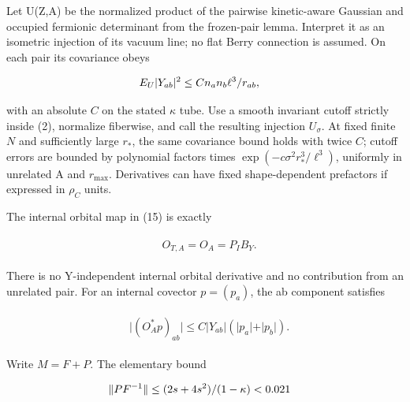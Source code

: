 Let U(Z,A) be the normalized product of the pairwise kinetic-aware
Gaussian and occupied fermionic determinant from the frozen-pair lemma.
Interpret it as an isometric injection of its vacuum line; no flat Berry
connection is assumed. On each pair its covariance obeys

\begin{gather*}
\begin{aligned}
& E_{U} \vert Y_{ab}\vert ^{2} \le  C n_{a} n_{b} \ell ^{3}/r_{ab},
\end{aligned}\notag
\end{gather*}

with an absolute \(C\) on the stated \(\kappa\) tube. Use a smooth
invariant cutoff strictly inside (2), normalize fiberwise, and call the
resulting injection \(U_{\sigma}\). At fixed finite \(N\) and
sufficiently large \(r_{*}\), the same covariance bound holds with twice
\(C\); cutoff errors are bounded by polynomial factors times
\(\exp (-c \sigma ^{2} r_{*}^{3}/\ell ^{3})\), uniformly in unrelated A
and \(r_{\max}\). Derivatives can have fixed shape-dependent prefactors
if expressed in \(\rho _{C}\) units.

The internal orbital map in (15) is exactly

\begin{gather*}
\begin{aligned}
& O_{T,A}=O_{A}=P_{I} B_{Y}.
\end{aligned}\tag{19}
\end{gather*}

There is no Y-independent internal orbital derivative and no
contribution from an unrelated pair. For an internal covector
\(p=(p_{a})\), the ab component satisfies

\begin{gather*}
\begin{aligned}
& \vert (O_{A}^{*}p)_{ab}\vert  \le  C \vert Y_{ab}\vert  (\vert p_{a}\vert +\vert p_{b}\vert ).
\end{aligned}\tag{20}
\end{gather*}

Write \(M=F+P\). The elementary bound

\begin{gather*}
\begin{aligned}
& \Vert P F^{-1}\Vert  \le (2s+4s^{2})/(1-\kappa )<0.021
\end{aligned}\notag
\end{gather*}

